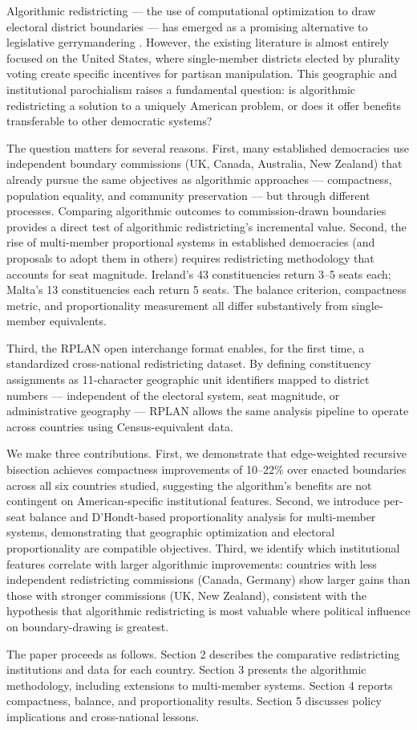 Algorithmic redistricting --- the use of computational optimization to draw electoral district boundaries --- has emerged as a promising alternative to legislative gerrymandering \citep{dellib2026edgeweighted, cirincione2000measuring, cho2017measuring}. However, the existing literature is almost entirely focused on the United States, where single-member districts elected by plurality voting create specific incentives for partisan manipulation. This geographic and institutional parochialism raises a fundamental question: is algorithmic redistricting a solution to a uniquely American problem, or does it offer benefits transferable to other democratic systems?

The question matters for several reasons. First, many established democracies use independent boundary commissions (UK, Canada, Australia, New Zealand) that already pursue the same objectives as algorithmic approaches --- compactness, population equality, and community preservation --- but through different processes. Comparing algorithmic outcomes to commission-drawn boundaries provides a direct test of algorithmic redistricting's incremental value. Second, the rise of multi-member proportional systems in established democracies (and proposals to adopt them in others) requires redistricting methodology that accounts for seat magnitude. Ireland's 43 constituencies return 3--5 seats each; Malta's 13 constituencies each return 5 seats. The balance criterion, compactness metric, and proportionality measurement all differ substantively from single-member equivalents.

Third, the RPLAN open interchange format \citep{redistcli2026} enables, for the first time, a standardized cross-national redistricting dataset. By defining constituency assignments as 11-character geographic unit identifiers mapped to district numbers --- independent of the electoral system, seat magnitude, or administrative geography --- RPLAN allows the same analysis pipeline to operate across countries using Census-equivalent data.

We make three contributions. First, we demonstrate that edge-weighted recursive bisection achieves compactness improvements of 10--22\% over enacted boundaries across all six countries studied, suggesting the algorithm's benefits are not contingent on American-specific institutional features. Second, we introduce per-seat balance and D'Hondt-based proportionality analysis for multi-member systems, demonstrating that geographic optimization and electoral proportionality are compatible objectives. Third, we identify which institutional features correlate with larger algorithmic improvements: countries with less independent redistricting commissions (Canada, Germany) show larger gains than those with stronger commissions (UK, New Zealand), consistent with the hypothesis that algorithmic redistricting is most valuable where political influence on boundary-drawing is greatest.

The paper proceeds as follows. Section 2 describes the comparative redistricting institutions and data for each country. Section 3 presents the algorithmic methodology, including extensions to multi-member systems. Section 4 reports compactness, balance, and proportionality results. Section 5 discusses policy implications and cross-national lessons.
